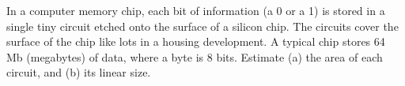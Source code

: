  In a computer memory chip, each bit of information (a 0
or a 1) is stored in a single tiny circuit etched onto the
surface of a silicon chip. The circuits cover the surface of
the chip like lots in a housing development. A typical chip
stores 64 Mb (megabytes) of data, where a byte is 8 bits.
Estimate (a) the area of each circuit, and (b) its linear size.
